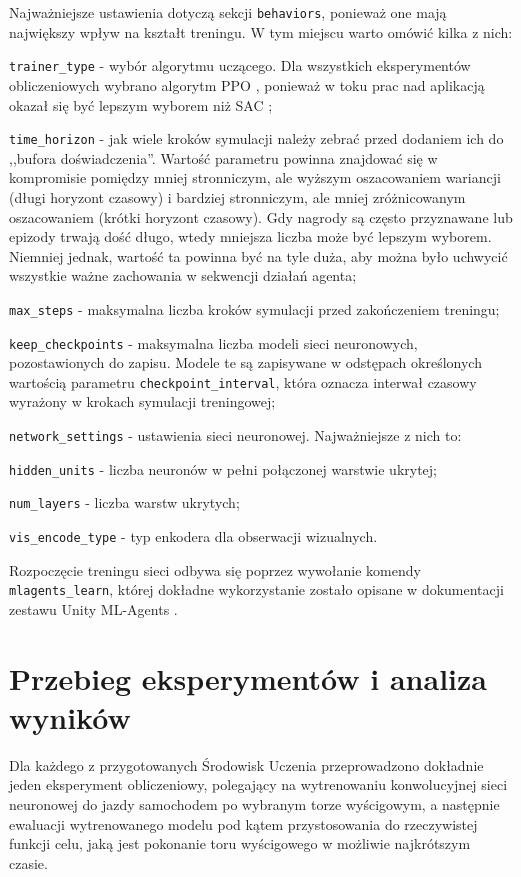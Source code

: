 Najważniejsze ustawienia dotyczą sekcji \texttt{behaviors}, ponieważ one mają największy wpływ na kształt treningu. W tym miejscu warto omówić kilka z nich:
\begin{enumerate*}
\item \texttt{trainer\_type} - wybór algorytmu uczącego. Dla wszystkich eksperymentów obliczeniowych wybrano algorytm PPO \cite{ppo:opis}, ponieważ w toku prac nad aplikacją okazał się być lepszym wyborem niż SAC \cite{sac:opis};
\item \texttt{time\_horizon} - jak wiele kroków symulacji należy zebrać przed dodaniem ich do ,,bufora doświadczenia''. Wartość parametru powinna znajdować się w kompromisie pomiędzy mniej stronniczym, ale wyższym oszacowaniem wariancji (długi horyzont czasowy) i bardziej stronniczym, ale mniej zróżnicowanym oszacowaniem (krótki horyzont czasowy). Gdy nagrody są często przyznawane lub epizody trwają dość długo, wtedy mniejsza liczba może być lepszym wyborem. Niemniej jednak, wartość ta powinna być na tyle duża, aby można było uchwycić wszystkie ważne zachowania w sekwencji działań agenta;
\item \texttt{max\_steps} - maksymalna liczba kroków symulacji przed zakończeniem treningu;
\item \texttt{keep\_checkpoints} - maksymalna liczba modeli sieci neuronowych, pozostawionych do zapisu. Modele te są zapisywane w odstępach określonych wartością parametru \texttt{checkpoint\_interval}, która oznacza interwał czasowy wyrażony w krokach symulacji treningowej; 
\item \texttt{network\_settings} - ustawienia sieci neuronowej. Najważniejsze z nich to:
\begin{itemize*}
\item \texttt{hidden\_units} - liczba neuronów w pełni połączonej warstwie ukrytej;
\item \texttt{num\_layers} - liczba warstw ukrytych;
\item \texttt{vis\_encode\_type} - typ enkodera dla obserwacji wizualnych.
\end{itemize*}
\end{enumerate*}

Rozpoczęcie treningu sieci odbywa się poprzez wywołanie komendy \texttt{mlagents\_learn}, której dokładne wykorzystanie zostało opisane w dokumentacji zestawu Unity ML-Agents \cite{unitymla:trainingMlAgents}.

\section{Przebieg eksperymentów i analiza wyników}
Dla każdego z przygotowanych Środowisk Uczenia przeprowadzono dokładnie jeden eksperyment obliczeniowy, polegający na wytrenowaniu konwolucyjnej sieci neuronowej do jazdy samochodem po wybranym torze wyścigowym, a następnie ewaluacji wytrenowanego modelu pod kątem przystosowania do rzeczywistej funkcji celu, jaką jest pokonanie toru wyścigowego w możliwie najkrótszym czasie.


